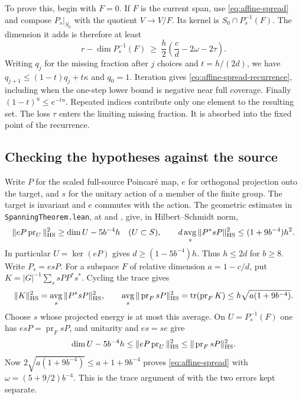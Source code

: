 To prove this, begin with $F=0$. If $F$ is the current span, use
\eqref{eq:affine-spread} and compose $P_s|_{S_0}$ with the quotient
$V\to V/F$. Its kernel is $S_0\cap P_s^{-1}(F)$. The dimension it adds is
therefore at least
\[
 r-\dim P_s^{-1}(F)\ \ge\ \frac{h}{2}\left(\frac{c}{d}
                                      -2\omega-2\tau\right).
\]
Writing $q_j$ for the missing fraction after $j$ choices and
$t=h/(2d)$, we have $q_{j+1}\le(1-t)q_j+t\kappa$ and $q_0=1$.
Iteration gives \eqref{eq:affine-spread-recurrence}, including when the
one-step lower bound is negative near full coverage. Finally
$(1-t)^u\le e^{-tu}$. Repeated indices contribute only one element to
the resulting set. The loss $\tau$ enters the limiting missing fraction.
It is absorbed into the fixed point of the recurrence.

\subsection*{Checking the hypotheses against the source}

Write $P$ for the scaled full-source Poincar\'e map, $e$ for orthogonal
projection onto the target, and $s$ for the unitary action of a member
of the finite group. The target is invariant and $e$ commutes with the
action. The geometric estimates in
\texttt{SpanningTheorem.lean}, at
 and
,
give, in Hilbert--Schmidt norm,
\[
 \|eP\operatorname{pr}_U\|_{\rm HS}^2\ge\dim U-5b^{-4}h
 \quad(U\subset S),\qquad
 d\,\underset{s}{\operatorname{avg}}\,\|P^*sP\|_{\rm HS}^2
 \le(1+9b^{-4})h^2 .
\]
In particular $U=\ker(eP)$ gives $d\ge(1-5b^{-4})h$. Thus $h\le 2d$
for $b\ge8$. Write $P_s=esP$.
For a subspace $F$ of relative dimension $a=1-c/d$, put
$K=|G|^{-1}\sum_s sPP^*s^*$. Cycling the trace gives
\[
 \|K\|_{\rm HS}^2=\underset{s}{\operatorname{avg}}\,\|P^*sP\|_{\rm HS}^2,
 \qquad
 \underset{s}{\operatorname{avg}}\,\|\operatorname{pr}_F sP\|_{\rm HS}^2
 =\operatorname{tr}(\operatorname{pr}_F K)
 \le h\sqrt{a(1+9b^{-4})}.
\]
Choose $s$ whose projected energy is at most this average. On
$U=P_s^{-1}(F)$ one has $esP=\operatorname{pr}_F sP$, and unitarity
and $es=se$ give
\[
 \dim U-5b^{-4}h
 \le \|eP\operatorname{pr}_U\|_{\rm HS}^2
 \le \|\operatorname{pr}_F sP\|_{\rm HS}^2.
\]
Now $2\sqrt{a(1+9b^{-4})}\le a+1+9b^{-4}$ proves
\eqref{eq:affine-spread} with $\omega=(5+9/2)b^{-4}$.
This is the trace argument of
with the two errors kept separate.

